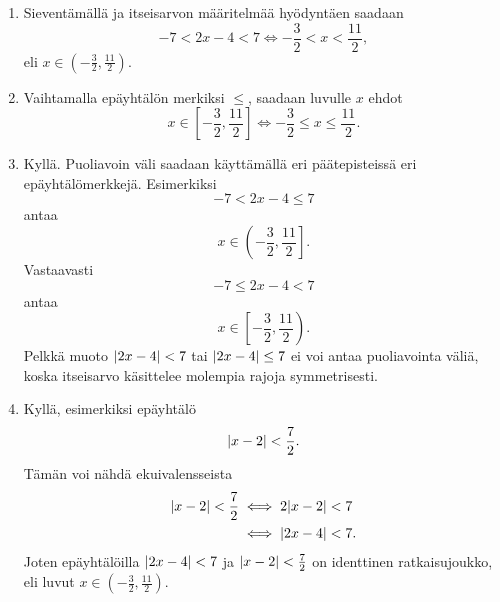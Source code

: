 \documentclass[12pt,a4paper]{article}
\begin{document}
\begin{solution}
\leavevmode\par
\begin{enumerate}[label=\alph*), nosep]
\item Sieventämällä ja itseisarvon määritelmää hyödyntäen saadaan
  \[-7 < 2x - 4 < 7 \iff -\frac{3}{2} < x < \frac{11}{2},\]
  eli \(x \in \left(-\frac{3}{2}, \frac{11}{2}\right)\).
  \begin{center}
  \end{center}
\item Vaihtamalla epäyhtälön merkiksi \(\leq\), saadaan luvulle \(x\) ehdot
  \[x \in \left[-\frac{3}{2}, \frac{11}{2}\right] \iff -\frac{3}{2} \leq x \leq
  \frac{11}{2}.\]
  \begin{center}
  \end{center}
\item Kyllä. Puoliavoin väli saadaan käyttämällä eri päätepisteissä eri
  epäyhtälömerkkejä. Esimerkiksi
  \[-7 < 2x - 4 \leq 7\]
  antaa
  \[x \in \left(-\frac{3}{2}, \frac{11}{2}\right].\]
  Vastaavasti
  \[-7 \leq 2x - 4 < 7\]
  antaa
  \[x \in \left[-\frac{3}{2}, \frac{11}{2}\right).\]
  Pelkkä muoto \(\lvert2x - 4\rvert < 7\) tai \(\lvert2x - 4\rvert \leq 7\) ei voi antaa
  puoliavointa väliä, koska itseisarvo käsittelee molempia rajoja symmetrisesti.
\item Kyllä, esimerkiksi epäyhtälö
  \[\lvert x - 2\rvert < \frac{7}{2}.\]
  Tämän voi nähdä ekuivalensseista
  \begin{align*}
    \lvert x - 2\rvert < \frac{7}{2} &\iff 2\lvert x - 2\rvert < 7 \\
    &\iff \lvert2x - 4\rvert < 7.
  \end{align*}
  Joten epäyhtälöilla \(\lvert2x - 4\rvert < 7\) ja \(\lvert x - 2\rvert < \frac{7}{2}\)
  on identtinen ratkaisujoukko, eli luvut \(x \in \left(-\frac{3}{2},
  \frac{11}{2}\right)\).
\end{enumerate}
\end{solution}
\end{document}
